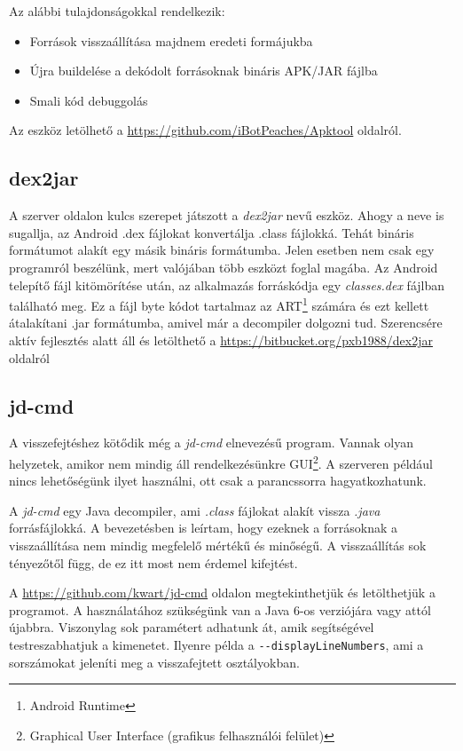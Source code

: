 \documentclass{thesis-ekf}
\theoremstyle{definition}
\theoremstyle{remark}
\begin{document}
Az alábbi tulajdonságokkal rendelkezik:

\begin{itemize}
	\item Források visszaállítása majdnem eredeti formájukba
	\item Újra buildelése a dekódolt forrásoknak bináris APK/JAR fájlba
	\item Smali kód debuggolás
\end{itemize}

Az eszköz letölhető a \url{https://github.com/iBotPeaches/Apktool} oldalról.

\subsection{dex2jar}

A  szerver oldalon kulcs szerepet játszott a \emph{dex2jar} nevű eszköz.
Ahogy a neve is sugallja, az Android .dex fájlokat konvertálja .class fájlokká.
Tehát bináris formátumot alakít egy másik bináris formátumba.
Jelen esetben nem csak egy programról beszélünk, mert valójában több eszközt foglal magába.
Az Android telepítő fájl kitömörítése után, az alkalmazás forráskódja egy \emph{classes.dex} fájlban található meg.
Ez a fájl byte kódot tartalmaz az ART\footnote{Android Runtime} számára és ezt kellett átalakítani .jar formátumba, amivel már a decompiler dolgozni tud.
Szerencsére aktív fejlesztés alatt áll és letölthető a \url{https://bitbucket.org/pxb1988/dex2jar} oldalról

\subsection{jd-cmd}

A visszefejtéshez kötődik még a \emph{jd-cmd} elnevezésű program.
Vannak olyan helyzetek, amikor nem mindig áll rendelkezésünkre GUI\footnote{Graphical User Interface (grafikus felhasználói felület)}.
A szerveren például nincs lehetőségünk ilyet használni, ott csak a parancssorra hagyatkozhatunk.

A \emph{jd-cmd} egy Java decompiler, ami \emph{.class} fájlokat alakít vissza \emph{.java} forrásfájlokká.
A bevezetésben is leírtam, hogy ezeknek a forrásoknak a visszaállítása nem mindig megfelelő mértékű és minőségű.
A visszaállítás sok tényezőtől függ, de ez itt most nem érdemel kifejtést.

A \url{https://github.com/kwart/jd-cmd} oldalon megtekinthetjük és letölthetjük a programot.
A használatához szükségünk van a Java 6-os verziójára vagy attól újabbra.
Viszonylag sok paramétert adhatunk át, amik segítségével testreszabhatjuk a kimenetet.
Ilyenre példa a \texttt{-{}-displayLineNumbers}, ami a sorszámokat jeleníti meg a visszafejtett osztályokban.
\end{document}
